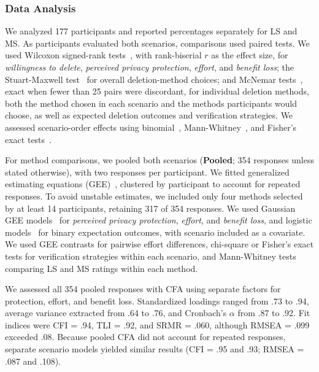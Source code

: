     \subsubsection{Data Analysis}
    We analyzed 177 participants and reported percentages separately for LS and MS. 
    As participants evaluated both scenarios, comparisons used paired tests. 
    We used Wilcoxon signed-rank tests~\cite{wilcoxon1945individual}, with rank-biserial $r$ as the effect size, for \textit{willingness to delete}, \textit{perceived privacy protection}, \textit{effort}, and \textit{benefit loss}; the Stuart-Maxwell test~\cite{agresti2013categorical} for overall deletion-method choices; and McNemar tests~\cite{agresti2013categorical}, exact when fewer than 25 pairs were discordant, for individual deletion methods, both the method chosen in each scenario and the methods participants would choose, as well as expected deletion outcomes and verification strategies. 
    We assessed scenario-order effects using binomial~\cite{agresti2013categorical}, Mann-Whitney~\cite{mann1947test}, and Fisher's exact tests~\cite{agresti2013categorical}. 

    For method comparisons, we pooled both scenarios (\textbf{Pooled}; 354 responses unless stated otherwise), with two responses per participant. 
    We fitted generalized estimating equations (GEE)~\cite{liang1986longitudinal}, clustered by participant to account for repeated responses. 
    To avoid unstable estimates, we included only four methods selected by at least 14 participants, retaining 317 of 354 responses. 
    We used Gaussian GEE models~\cite{liang1986longitudinal} for \textit{perceived privacy protection}, \textit{effort}, and \textit{benefit loss}, and logistic models~\cite{agresti2013categorical} for binary expectation outcomes, with scenario included as a covariate. 
    We used GEE contrasts for pairwise effort differences, chi-square or Fisher's exact tests for verification strategies within each scenario, and Mann-Whitney tests~\cite{mann1947test} comparing LS and MS ratings within each method.


    We assessed all 354 pooled responses with CFA using separate factors for protection, effort, and benefit loss.
    Standardized loadings ranged from .73 to .94, average variance extracted from .64 to .76, and Cronbach's $\alpha$ from .87 to .92. Fit indices were CFI = .94, TLI = .92, and SRMR = .060, although RMSEA = .099 exceeded .08.
    Because pooled CFA did not account for repeated responses, separate scenario models yielded similar results (CFI = .95 and .93; RMSEA = .087 and .108). 

